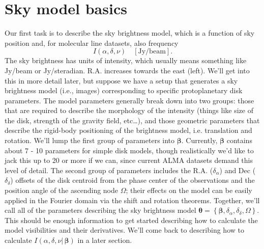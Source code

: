 \documentclass[modern]{aastex62}
\newcommand{\bbeta}{\boldsymbol{\beta}} %
\newcommand{\btheta}{\boldsymbol{\theta}} %
\begin{document}

\section{Sky model basics}
Our first task is to describe the sky brightness model, which is a function of sky position and, for molecular line datasets, also frequency
\begin{equation}
    I(\alpha, \delta, \nu) \quad [\mathrm{Jy/beam}].
\end{equation}
The sky brightness has units of intensity, which usually means something like Jy/beam or Jy/steradian. R.A. increases towards the east (left). We'll get into this in more detail later, but suppose we have a setup that generates a sky brightness model (i.e., images) corresponding to specific protoplanetary disk parameters. The model parameters generally break down into two groups: those that are required to describe the morphology of the intensity (things like size of the disk, strength of the gravity field, etc\ldots), and those geometric parameters that describe the rigid-body positioning of the brightness model, i.e. translation and rotation. We'll lump the first group of parameters into $\bbeta$. Currently, $\bbeta$ contains about 7 - 10 parameters for simple disk models, though realistically we'd like to jack this up to 20 or more if we can, since current ALMA datasets demand this level of detail. The second group of parameters includes the R.A. ($\delta_\alpha$) and Dec ($\delta_\delta$) offsets of the disk centroid from the phase center of the observations and the position angle of the ascending node $\Omega$; their effects on the model can be easily applied in the Fourier domain via the shift and rotation theorems. Together, we'll call all of the  parameters describing the sky brightness model $\btheta = \left \{ \bbeta, \delta_\alpha, \delta_\delta, \Omega \right \}$. This should be enough information to get started describing how to calculate the model visibilities and their derivatives. We'll come back to describing how to calculate $I(\alpha, \delta, \nu |\, \bbeta)$ in a later section.  
\end{document}
